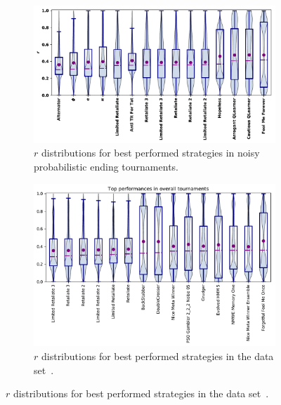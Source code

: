 \documentclass{article}
\begin{document}
\begin{figure}[!htbp]
    \centering
    \begin{subfigure}{0.475\textwidth}
        \centering
        \includegraphics[width=\textwidth]{../images/performance_probend_noise.pdf}
        \caption{\(r\) distributions for best performed strategies in noisy
        probabilistic ending tournaments.}
        \label{fig:noisy_probend_results}
    \end{subfigure}
    \hfill
    \begin{subfigure}{0.475\textwidth}
        \centering
        \includegraphics[width=\textwidth]{../images/performance_merged.pdf}
        \caption{\(r\) distributions for best performed strategies in the data set~\cite{data}.}
        \label{fig:overall_results}
    \end{subfigure}
\end{figure}
\end{document}
